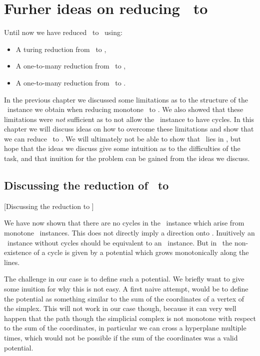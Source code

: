 \setchapterpreamble[u]{\margintoc}
\chapter{Furher ideas on reducing \Tarski\ to \EOPL}\label{ch:eopl_reduction}

Until now we have reduced \Tarski\ to \EndOfLine\ using:
\begin{itemize}
	\item A turing reduction from \Tarski\ to \Tarskistar,
	\item A one-to-many reduction from \Tarskistar\ to \Sperner,
	\item A one-to-many reduction from \Sperner\ to \EndOfLine.
\end{itemize}
In the previous chapter we discussed some limitations as to the structure of the \Sperner\ instance we obtain when reducing monotone \Tarskistar\ to \Sperner. We also showed that these limitations were \emph{not} sufficient as to not allow the \EndOfLine\ instance to have cycles. In this chapter we will discuss ideas on how to overcome these limitations and show that we can reduce \Tarski\ to \EndOfPotentialLine\@. We will ultimately not be able to show that \Tarski\ lies in \EOPL, but hope that the ideas we discuss give some intuition as to the difficulties of the task, and that inuition for the problem can be gained from the ideas we discuss.

\section{Discussing the reduction of \Tarskistar\ to \EndOfPotentialLine}[Discussing the reduction to \EOPL]

We have now shown that there are no cycles in the \EndOfLine\ instance which arise from monotone \Tarskistar\ instances. This does not directly imply a direction onto \EndOfPotentialLine. Inuitively an \EndOfLine\ instance without cycles should be equivalent to an \EndOfPotentialLine\ instance. But in \EndOfPotentialLine\ the non-existence of a cycle is given by a potential which grows monotonically along the lines.

The challenge in our case is to define such a potential. We briefly want to give some inuition for why this is not easy. A first naive attempt, would be to define the potential as something similar to the sum of the coordinates of a vertex of the simplex. This will not work in our case though, because it can very well happen that the path though the simplicial complex is not monotone with respect to the sum of the coordinates, in particular we can cross a hyperplane multiple times, which would not be possible if the sum of the coordinates was a valid potential.

